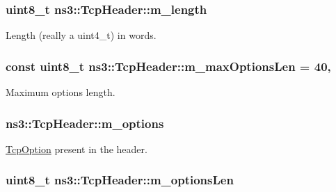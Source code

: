 \subsubsection[{\texorpdfstring{m\+\_\+length}{m_length}}]{\setlength{\rightskip}{0pt plus 5cm}uint8\+\_\+t ns3\+::\+Tcp\+Header\+::m\+\_\+length\hspace{0.3cm}{\ttfamily [private]}}\hypertarget{classns3_1_1TcpHeader_a501531d63af9e3950e137df87fc054da}{}\label{classns3_1_1TcpHeader_a501531d63af9e3950e137df87fc054da}


Length (really a uint4\+\_\+t) in words. 

\subsubsection[{\texorpdfstring{m\+\_\+max\+Options\+Len}{m_maxOptionsLen}}]{\setlength{\rightskip}{0pt plus 5cm}const uint8\+\_\+t ns3\+::\+Tcp\+Header\+::m\+\_\+max\+Options\+Len = 40\hspace{0.3cm}{\ttfamily [static]}, {\ttfamily [private]}}\hypertarget{classns3_1_1TcpHeader_a58c3a4deba26f4c3bce21915bcef09ea}{}\label{classns3_1_1TcpHeader_a58c3a4deba26f4c3bce21915bcef09ea}


Maximum options length. 

\subsubsection[{\texorpdfstring{m\+\_\+options}{m_options}}]{ ns3\+::\+Tcp\+Header\+::m\+\_\+options\hspace{0.3cm}{\ttfamily [private]}}\hypertarget{classns3_1_1TcpHeader_af0a6b523e1769d521e2a90caa1c8b4d2}{}\label{classns3_1_1TcpHeader_af0a6b523e1769d521e2a90caa1c8b4d2}


\hyperlink{classns3_1_1TcpOption}{Tcp\+Option} present in the header. 

\subsubsection[{\texorpdfstring{m\+\_\+options\+Len}{m_optionsLen}}]{\setlength{\rightskip}{0pt plus 5cm}uint8\+\_\+t ns3\+::\+Tcp\+Header\+::m\+\_\+options\+Len\hspace{0.3cm}{\ttfamily [private]}}\hypertarget{classns3_1_1TcpHeader_a36cbd14a45d74bfd2645f6a2f6772c7d}{}\label{classns3_1_1TcpHeader_a36cbd14a45d74bfd2645f6a2f6772c7d}



